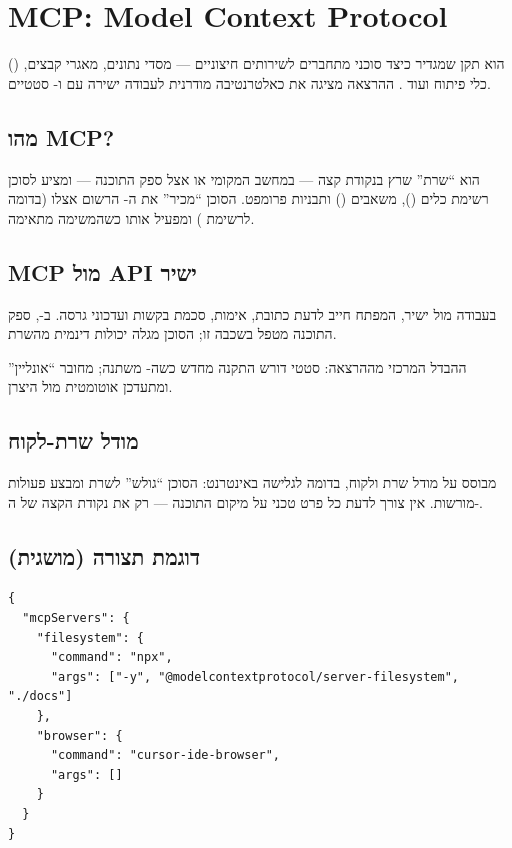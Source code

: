 \section{MCP: Model Context Protocol}

 () הוא תקן שמגדיר כיצד סוכני 
מתחברים לשירותים חיצוניים --- מסדי נתונים, מאגרי קבצים, כלי פיתוח ועוד
\cite{anthropic2024mcp}. ההרצאה מציגה את  כאלטרנטיבה מודרנית
לעבודה ישירה עם  ו- סטטיים.



\subsection{מהו MCP?}

 הוא ``שרת'' שרץ בנקודת קצה --- במחשב המקומי או אצל ספק התוכנה ---
ומציע לסוכן רשימת כלים (), משאבים () ותבניות
פרומפט. הסוכן ``מכיר'' את ה- הרשום אצלו (בדומה לרשימת )
ומפעיל אותו כשהמשימה מתאימה.

\subsection{MCP מול API ישיר}

בעבודה מול  ישיר, המפתח חייב לדעת כתובת, אימות, סכמת בקשות
ועדכוני גרסה. ב-, ספק התוכנה מטפל בשכבה זו; הסוכן מגלה יכולות
דינמית מהשרת.

\begin{insightbox}
ההבדל המרכזי מההרצאה:  סטטי דורש התקנה מחדש כשה-
משתנה;  מחובר ``אונליין'' ומתעדכן אוטומטית מול היצרן.
\end{insightbox}

\subsection{מודל שרת-לקוח}

 מבוסס על מודל שרת ולקוח, בדומה לגלישה באינטרנט: הסוכן ``גולש''
לשרת ומבצע פעולות מורשות. אין צורך לדעת כל פרט טכני על מיקום התוכנה ---
רק את נקודת הקצה של ה-.

\subsection{דוגמת תצורה (מושגית)}

\begin{lstlisting}[caption={דוגמת הגדרת MCP בקובץ JSON}]
{
  "mcpServers": {
    "filesystem": {
      "command": "npx",
      "args": ["-y", "@modelcontextprotocol/server-filesystem", "./docs"]
    },
    "browser": {
      "command": "cursor-ide-browser",
      "args": []
    }
  }
}
\end{lstlisting}

